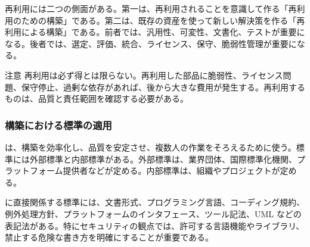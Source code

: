 再利用には二つの側面がある。第一は、再利用されることを意識して作る「再利用のための構築」である。第二は、既存の資産を使って新しい解決策を作る「再利用による構築」である。前者では、汎用性、可変性、文書化、テストが重要になる。後者では、選定、評価、統合、ライセンス、保守、脆弱性管理が重要になる。

\begin{keybox}{注意}
再利用は必ず得とは限らない。再利用した部品に脆弱性、ライセンス問題、保守停止、過剰な依存があれば、後から大きな費用が発生する。再利用するものは、品質と責任範囲を確認する必要がある。
\end{keybox}

\subsubsection{構築における標準の適用}

は、構築を効率化し、品質を安定させ、複数人の作業をそろえるために使う。標準には外部標準と内部標準がある。外部標準は、業界団体、国際標準化機関、プラットフォーム提供者などが定める。内部標準は、組織やプロジェクトが定める。

に直接関係する標準には、文書形式、プログラミング言語、コーディング規約、例外処理方針、プラットフォームのインタフェース、ツール記法、UML などの表記法がある。特にセキュリティの観点では、許可する言語機能やライブラリ、禁止する危険な書き方を明確にすることが重要である。
